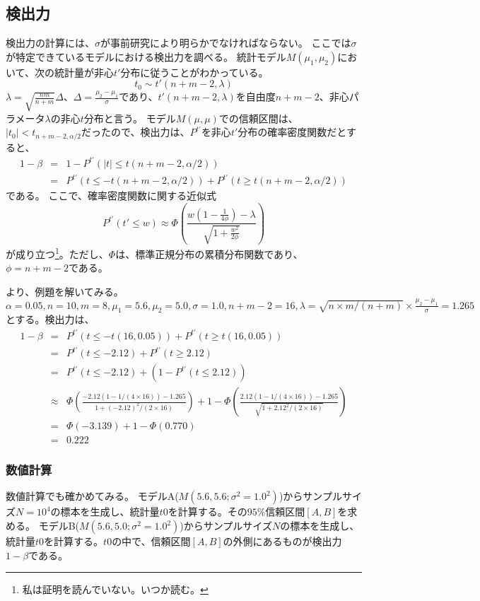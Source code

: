 \subsection{検出力}
検出力の計算には、$\sigma$が事前研究により明らかでなければならない。
ここでは$\sigma$が特定できているモデルにおける検出力を調べる。
統計モデル$M(\mu_1,\mu_2)$において、次の統計量が非心$t'$分布に従うことがわかっている。
\begin{equation*}
     t_0\sim t'(n+m-2,\lambda)
\end{equation*}
$\lambda = \sqrt{\frac{nm}{n+m}}\Delta$、$\Delta =\frac{\mu_2-\mu_1}{\sigma}$であり、$t'(n+m-2,\lambda)$を自由度$n+m-2$、非心パラメータ$\lambda$の非心$t$分布と言う。
モデル$M(\mu,\mu)$での信頼区間は、$|t_0|<t_{n+m-2,\alpha/2}$だったので、検出力は、$P^{t'}$を非心$t'$分布の確率密度関数だとすると、
\begin{eqnarray*}
    1-\beta &=& 1-P^{t'}( |t| \leq t(n+m-2,\alpha/2)) \\
    &=& P^{t'}( t \leq -t(n+m-2,\alpha/2))+P^{t'}(t \geq t(n+m-2,\alpha/2))
\end{eqnarray*}
である。
ここで、確率密度関数に関する近似式
\begin{equation*}
    P^{t'}(t'\leq w) \approx \varPhi \left( \frac{w(1-\frac{1}{4\phi})-\lambda}{\sqrt{1+\frac{w^2}{2\phi}}} \right)
\end{equation*}
が成り立つ\cite{2003サンプルサイズの決め方}\footnote{私は証明を読んでいない。いつか読む。}。ただし、$\varPhi$は、標準正規分布の累積分布関数であり、$\phi=n+m-2$である。

\cite{2003サンプルサイズの決め方}より、例題を解いてみる。
$\alpha=0.05,n=10,m=8,\mu_1=5.6,\mu_2=5.0,\sigma=1.0,n+m-2 = 16,\lambda=\sqrt{n\times m/(n+m)} \times \frac{\mu_2-\mu_1}{\sigma} = 1.265 $とする。検出力は、
\begin{eqnarray*}
    1-\beta &=& P^{t'}(t \leq -t(16,0.05))+P^{t'}(t \geq t(16,0.05)) \\
    &=& P^{t'}(t \leq -2.12)+P^{t'}(t\geq 2.12) \\
    &=& P^{t'}(t \leq -2.12)+(1-P^{t'}(t\leq 2.12)) \\
    &\approx& \varPhi(\frac{-2.12(1-1/(4\times 16))-1.265}{1+(-2.12)^2/(2\times 16)}) +1-\varPhi(\frac{2.12(1-1/(4\times 16))-1.265}{\sqrt{1+2.12^2/(2\times 16)}}) \\
    &=& \varPhi(-3.139)+1-\varPhi(0.770) \\
    &=& 0.222
\end{eqnarray*}

\subsubsection*{数値計算}
数値計算でも確かめてみる。
モデルA($M(5.6,5.6;\sigma^2=1.0^2)$)からサンプルサイズ$N=10^4$の標本を生成し、統計量$t0$を計算する。その$95\%$信頼区間$[A,B]$を求める。
モデルB($M(5.6,5.0;\sigma^2=1.0^2)$)からサンプルサイズ$N$の標本を生成し、統計量$t0$を計算する。$t0$の中で、信頼区間$[A,B]$の外側にあるものが検出力$1-\beta$である。

